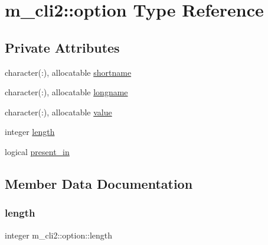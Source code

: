 \hypertarget{structm__cli2_1_1option}{}\section{m\+\_\+cli2\+:\+:option Type Reference}
\label{structm__cli2_1_1option}
\subsection*{Private Attributes}
\begin{DoxyCompactItemize}
\item 
character(\+:), allocatable \mbox{\hyperlink{structm__cli2_1_1option_aebe0555d86a8533193827e348ba65e11}{shortname}}
\item 
character(\+:), allocatable \mbox{\hyperlink{structm__cli2_1_1option_ad06a078849a4fdfa9bb2cfae876631cd}{longname}}
\item 
character(\+:), allocatable \mbox{\hyperlink{structm__cli2_1_1option_a5fbaefeb93cda8c948cdc7e6de156cd6}{value}}
\item 
integer \mbox{\hyperlink{structm__cli2_1_1option_ac034140ca495c577b2b45a89c25ed16a}{length}}
\item 
logical \mbox{\hyperlink{structm__cli2_1_1option_a89ee89aa168edd8c3e2064b0825e79f8}{present\+\_\+in}}
\end{DoxyCompactItemize}


\subsection{Member Data Documentation}
\mbox{\label{structm__cli2_1_1option_ac034140ca495c577b2b45a89c25ed16a}} 
\subsubsection{\texorpdfstring{length}{length}}
{\footnotesize\ttfamily integer m\+\_\+cli2\+::option\+::length\hspace{0.3cm}{\ttfamily [private]}}

\mbox{\label{structm__cli2_1_1option_ad06a078849a4fdfa9bb2cfae876631cd}} 
